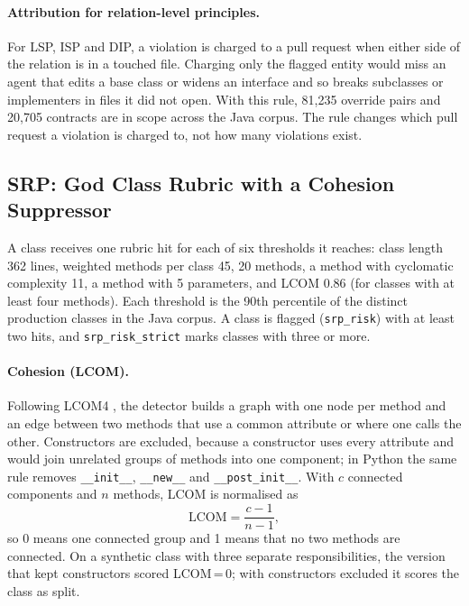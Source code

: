 \paragraph{Attribution for relation-level principles.} For LSP, ISP and DIP, a violation is charged
to a pull request when either side of the relation is in a touched file. Charging only the flagged
entity would miss an agent that edits a base class or widens an interface and so breaks subclasses or
implementers in files it did not open. With this rule, 81{,}235 override pairs and 20{,}705
contracts are in scope across the Java corpus. The rule changes which pull request a violation is
charged to, not how many violations exist.

\subsection{SRP: God Class Rubric with a Cohesion Suppressor}

A class receives one rubric hit for each of six thresholds it reaches: class length 362 lines,
weighted methods per class 45, 20 methods, a method with cyclomatic complexity 11, a method with 5
parameters, and LCOM 0.86 (for classes with at least four methods). Each threshold is the 90th
percentile of the distinct production classes in the Java corpus. A class is flagged
(\texttt{srp\_risk}) with at least two hits, and \texttt{srp\_risk\_strict} marks classes with three
or more.

\paragraph{Cohesion (LCOM).} Following LCOM4 \citep{hitz1995cohesion}, the detector builds a graph
with one node per method and an edge between two methods that use a common attribute or where one
calls the other. Constructors are excluded, because a constructor uses every attribute and would join
unrelated groups of methods into one component; in Python the same rule removes
\texttt{\_\_init\_\_}, \texttt{\_\_new\_\_} and \texttt{\_\_post\_init\_\_}. With $c$ connected
components and $n$ methods, LCOM is normalised as
\begin{equation}
\text{LCOM} = \frac{c - 1}{n - 1},
\end{equation}
so 0 means one connected group and 1 means that no two methods are connected. On a synthetic class
with three separate responsibilities, the version that kept constructors scored LCOM\,=\,0; with
constructors excluded it scores the class as split.

